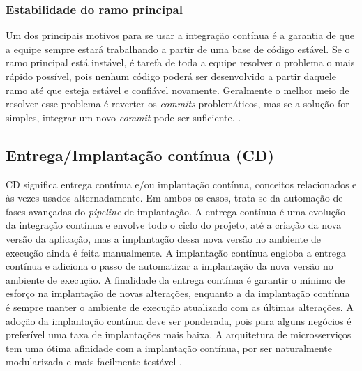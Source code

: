 \subsubsection{Estabilidade do ramo principal}
Um dos principais motivos para se usar a integração contínua é a garantia de que a equipe sempre estará trabalhando a partir de uma base de código estável. Se o ramo principal está instável, é tarefa de toda a equipe resolver o problema o mais rápido possível, pois nenhum código poderá ser desenvolvido a partir daquele ramo até que esteja estável e confiável novamente. Geralmente o melhor meio de resolver esse problema é reverter os \emph{commits} problemáticos, mas se a solução for simples, integrar um novo \emph{commit} pode ser suficiente. \cite{martin-fowler-continuous-integration}.



\subsection{Entrega/Implantação contínua (CD)}
CD significa entrega contínua e/ou implantação contínua, conceitos relacionados e às vezes usados alternadamente. Em ambos os casos, trata-se da automação de fases avançadas do \emph{pipeline} de implantação. A entrega contínua é uma evolução da integração contínua e envolve todo o ciclo do projeto, até a criação da nova versão da aplicação, mas a implantação dessa nova versão no ambiente de execução ainda é feita manualmente. A implantação contínua engloba a entrega contínua e adiciona o passo de automatizar a implantação da nova versão no ambiente de execução. A finalidade da entrega contínua é garantir o mínimo de esforço na implantação de novas alterações, enquanto a da implantação contínua é sempre manter o ambiente de execução atualizado com as últimas alterações. A adoção da implantação contínua deve ser ponderada, pois para alguns negócios é preferível uma taxa de implantações mais baixa. A arquitetura de microsserviços tem uma ótima afinidade com a implantação contínua, por ser naturalmente modularizada e mais facilmente testável \cite{gitlab-ci-cd,redhat-ci-cd}.

